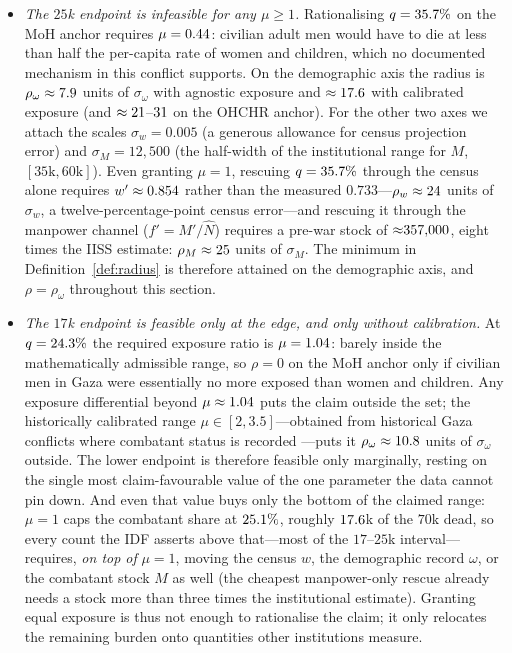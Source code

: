 \begin{itemize}[leftmargin=*]
\item \emph{The $25$k endpoint is infeasible for any $\mu\ge 1$.} Rationalising $q=35.7{}\%$ on the MoH anchor requires $\mu=0.44{}$: civilian adult men would have to die at less than half the per-capita rate of women and children, which no documented mechanism in this conflict supports. On the demographic axis the radius is $\rho_\omega\approx 7.9{}$ units of $\sigma_\omega$ with agnostic exposure and $\approx 17.6{}$ with calibrated exposure (and $\approx 21{}$--$31{}$ on the OHCHR anchor). For the other two axes we attach the scales $\sigma_w=0.005$ (a generous allowance for census projection error) and $\sigma_M=12{,}500$ (the half-width of the institutional range for $M$, $[35\mathrm{k},60\mathrm{k}]$). Even granting $\mu=1$, rescuing $q=35.7{}\%$ through the census alone requires $w'\approx 0.854{}$ rather than the measured $0.733$---$\rho_w\approx 24{}$ units of $\sigma_w$, a twelve-percentage-point census error---and rescuing it through the manpower channel ($f'=M'/\hat N$) requires a pre-war stock of ${\approx}357{,}000{}$, eight times the IISS estimate: $\rho_M\approx 25{}$ units of $\sigma_M$. The minimum in Definition~\ref{def:radius} is therefore attained on the demographic axis, and $\rho=\rho_\omega$ throughout this section.
\item \emph{The $17$k endpoint is feasible only at the edge, and only without calibration.} At $q=24.3{}\%$ the required exposure ratio is $\mu=1.04{}$: barely inside the mathematically admissible range, so $\rho=0$ on the MoH anchor only if civilian men in Gaza were essentially no more exposed than women and children. Any exposure differential beyond $\mu\approx 1.04{}$ puts the claim outside the set; the historically calibrated range $\mu\in[2,3.5]$---obtained from historical Gaza conflicts where combatant status is recorded \citep{frost2026}---puts it $\rho_\omega\approx 10.8{}$ units of $\sigma_\omega$ outside. The lower endpoint is therefore feasible only marginally, resting on the single most claim-favourable value of the one parameter the data cannot pin down. And even that value buys only the bottom of the claimed range: $\mu=1$ caps the combatant share at $25.1{}\%$, roughly $17.6{}$k of the $70$k dead, so every count the IDF asserts above that---most of the $17$--$25$k interval---requires, \emph{on top of} $\mu=1$, moving the census $w$, the demographic record $\omega$, or the combatant stock $M$ as well (the cheapest manpower-only rescue already needs a stock more than three times the institutional estimate). Granting equal exposure is thus not enough to rationalise the claim; it only relocates the remaining burden onto quantities other institutions measure.
\end{itemize}
